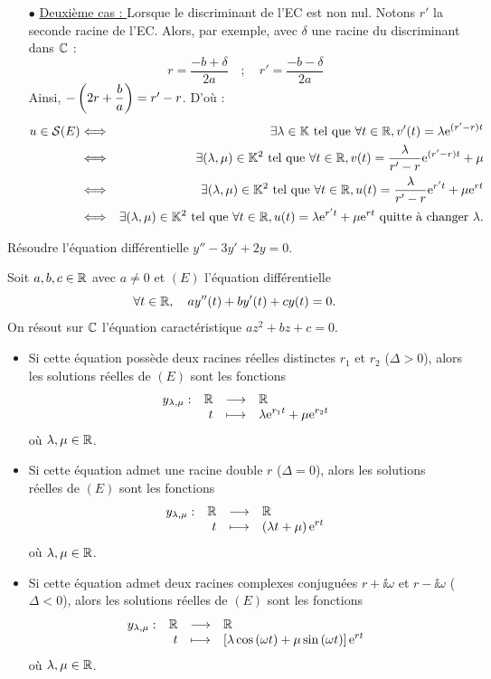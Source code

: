 \documentclass{magnoliaold}
\begin{document}
\begin{preuve}
\begin{victor}
\begin{itemize}
\item [$\bullet$] \underline{Deuxième cas : } Lorsque le discriminant de l'EC est non nul. Notons $r'$ la seconde racine de l'EC. Alors, par exemple, avec $\delta$ une racine du discriminant dans $\mathbb{C}$ :
\[r=\dfrac{-b+\delta}{2a} \quad ; \quad r'=\dfrac{-b-\delta}{2a}\]
Ainsi, $-\left(2r+\dfrac{b}{a}\right)=r'-r$. D'où :
\begin{eqnarray*}
u\in \mathcal{S}(E)&\Longleftrightarrow & \exists \lambda\in\mathbb{K} \text{ tel que } \forall t \in \mathbb{R}, v'(t)=\lambda{\rm e}^{(r'-r)t}\\
&\Longleftrightarrow & \exists (\lambda,\mu)\in\mathbb{K}^2 \text{ tel que } \forall t \in \mathbb{R}, v(t)=\frac{\lambda}{r'-r}{\rm e}^{(r'-r)t}+\mu\\
&\Longleftrightarrow & \exists (\lambda,\mu)\in\mathbb{K}^2 \text{ tel que } \forall t \in \mathbb{R}, u(t)=\frac{\lambda}{r'-r}{\rm e}^{r't}+\mu{\rm e}^{rt}\\
&\Longleftrightarrow & \exists (\lambda,\mu)\in\mathbb{K}^2 \text{ tel que } \forall t \in \mathbb{R}, u(t)=\lambda{\rm e}^{r't}+\mu{\rm e}^{rt} \text{ quitte à changer }\lambda.
\end{eqnarray*}
\end{itemize}
\end{victor}
\end{preuve}


\begin{exoUnique}
\exo Résoudre l'équation différentielle $y''-3y'+2y=0$.
\end{exoUnique}

\begin{proposition}[utile=-3]
Soit $a,b,c\in\mathbb{R}$ avec $a\neq 0$ et $(E)$ l'équation différentielle
\[\forall t\in\mathbb{R} ,\quad a y''(t)+by'(t)+cy(t)=0.\]
On résout sur $\mathbb{C}$ l'équation caractéristique $az^2+bz+c=0$.
\begin{itemize}
\item Si cette équation possède deux racines réelles distinctes $r_1$ et $r_2$
  ($\Delta> 0$), alors les solutions réelles de $(E)$ sont les fonctions
  \[\begin{array}[t]{lrcl} \displaystyle{y_{\lambda,\mu}} : & \displaystyle{\mathbb{R}} & \longrightarrow & \displaystyle{\mathbb{R}} \\ & \displaystyle{t} & \longmapsto & \displaystyle{\lambda {\rm e}^{r_1 t}+\mu {\rm e}^{r_2 t}} \end{array}\]
  où $\lambda,\mu\in\mathbb{R}$.
\item Si cette équation admet une racine double $r$ ($\Delta=0$), alors les
  solutions réelles de $(E)$ sont les fonctions
  \[\begin{array}[t]{lrcl} \displaystyle{y_{\lambda,\mu}} : & \displaystyle{\mathbb{R}} & \longrightarrow & \displaystyle{\mathbb{R}} \\ & \displaystyle{t} & \longmapsto & \displaystyle{\left(\lambda t+\mu\right){\rm e}^{r t}} \end{array}\]
  où $\lambda,\mu\in\mathbb{R}$.
\item Si cette équation admet deux racines complexes conjuguées $r+\ii\omega$ et
  $r-\ii\omega$ ($\Delta <0$), alors les solutions réelles de $(E)$ sont les
  fonctions
  \[\begin{array}[t]{lrcl} \displaystyle{y_{\lambda,\mu}} : & \displaystyle{\mathbb{R}} & \longrightarrow & \displaystyle{\mathbb{R}} \\ & \displaystyle{t} & \longmapsto & \displaystyle{\left[\lambda\cos\left(\omega t\right)+
    \mu\sin\left(\omega t\right)\right]{\rm e}^{r t}} \end{array}\]
  où $\lambda,\mu\in\mathbb{R}$.
\end{itemize}
\end{proposition}
\end{document}
